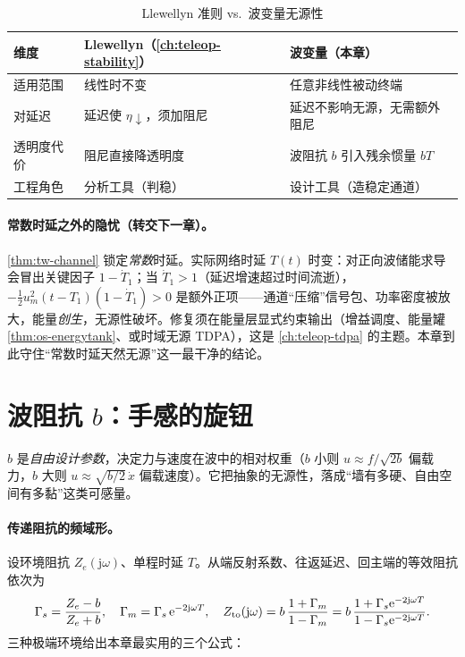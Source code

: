 \begin{table}[H]\centering\small
\caption{Llewellyn 准则 vs.\ 波变量无源性}
\label{tab:tw-vs-llewellyn}
\begin{tabular}{lll}
\toprule
维度 & Llewellyn（\cref{ch:teleop-stability}） & 波变量（本章） \\
\midrule
适用范围 & 线性时不变 & 任意非线性被动终端 \\
对延迟 & 延迟使 $\eta\downarrow$，须加阻尼 & 延迟不影响无源，无需额外阻尼 \\
透明度代价 & 阻尼直接降透明度 & 波阻抗 $b$ 引入残余惯量 $bT$ \\
工程角色 & 分析工具（判稳） & 设计工具（造稳定通道） \\
\bottomrule
\end{tabular}
\end{table}

\paragraph{常数时延之外的隐忧（转交下一章）。}
\cref{thm:tw-channel} 锁定\emph{常数}时延。实际网络时延 $T(t)$ 时变：对正向波储能求导会冒出关键因子 $1-\dot T_1$；当 $\dot T_1>1$（延迟增速超过时间流逝），$-\tfrac12 u_m^2(t-T_1)(1-\dot T_1)>0$ 是额外正项——通道“压缩”信号包、功率密度被放大，能量\emph{创生}，无源性破坏。修复须在能量层显式约束输出（增益调度、能量罐 \cref{thm:os-energytank}、或时域无源 TDPA），这是 \cref{ch:teleop-tdpa} 的主题。本章到此守住“常数时延天然无源”这一最干净的结论。

\section{波阻抗 \texorpdfstring{$b$}{b}：手感的旋钮}
\label{sec:tw-impedance}

$b$ 是\emph{自由设计参数}，决定力与速度在波中的相对权重（$b$ 小则 $u\approx f/\sqrt{2b}$ 偏载力，$b$ 大则 $u\approx\sqrt{b/2}\,\dot x$ 偏载速度）。它把抽象的无源性，落成“墙有多硬、自由空间有多黏”这类可感量。

\paragraph{传递阻抗的频域形。}
设环境阻抗 $Z_e(\mathrm j\omega)$、单程时延 $T$。从端反射系数、往返延迟、回主端的等效阻抗依次为
\begin{equation}
  \Gamma_s=\frac{Z_e-b}{Z_e+b},\quad \Gamma_m=\Gamma_s\,\mathrm e^{-2\mathrm j\omega T},\quad
  Z_{\rm to}(\mathrm j\omega)=b\,\frac{1+\Gamma_m}{1-\Gamma_m}=b\,\frac{1+\Gamma_s\mathrm e^{-2\mathrm j\omega T}}{1-\Gamma_s\mathrm e^{-2\mathrm j\omega T}}.
  \label{eq:tw-Zto}
\end{equation}
三种极端环境给出本章最实用的三个公式：

